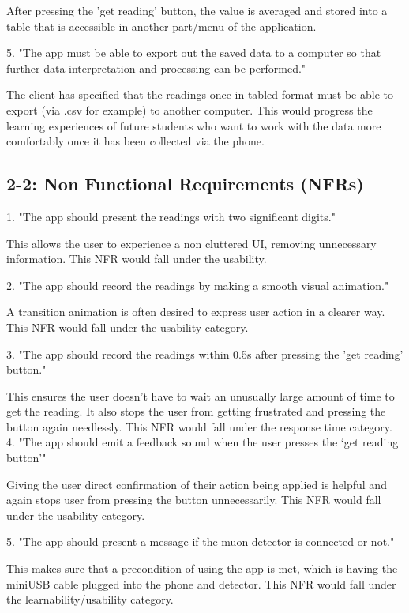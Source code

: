 \documentclass[11pt,a4paper]{article}
\begin{document}
After pressing the 'get reading' button, the value is averaged and stored into a table that is accessible in another part/menu of the application.

\vskip 6mm
5. "The app must be able to export out the saved data to a computer so that further data interpretation and processing can be performed."

The client has specified that the readings once in tabled format must be able to export (via .csv for example) to another computer. This would progress the learning experiences of future students who want to work with the data more comfortably once it has been collected via the phone.  


\subsection*{2-2: Non Functional Requirements (NFRs)}

1. "The app should present the readings with two significant digits."

This allows the user to experience a non cluttered UI, removing unnecessary information. This NFR would fall under the usability. 

\vskip 4mm

2. "The app should record the readings by making a smooth visual animation."

A transition animation is often desired to express user action in a clearer way. This NFR would fall under the usability category. 

\vskip 4mm

3. "The app should record the readings within 0.5s after pressing the 'get reading' button."

This ensures the user doesn't have to wait an unusually large amount of time to get the reading. It also stops the user from getting frustrated and pressing the button again needlessly. This NFR would fall under the response time category. 
\vskip 4mm
4. "The app should emit a feedback sound when the user presses the ‘get reading button’" 

Giving the user direct confirmation of their action being applied is helpful and again stops user from pressing the button unnecessarily. This NFR would fall under the usability category.

\vskip 4mm
5. "The app should present a message if the muon detector is connected or not."

This makes sure that a precondition of using the app is met, which is having the miniUSB cable plugged into the phone and detector. This NFR would fall under the learnability/usability category. 
\end{document}
